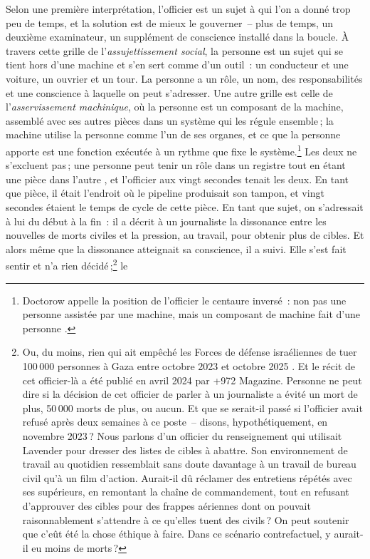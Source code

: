 Selon une première interprétation, l'officier est un sujet à qui l'on a donné trop peu de temps, et la solution est de mieux le gouverner~– plus de temps, un deuxième examinateur, un supplément de conscience installé dans la boucle. À travers cette grille de l'\emph{assujettissement social}, la personne est un sujet qui se tient hors d'une machine et s'en sert comme d'un outil~: un conducteur et une voiture, un ouvrier et un tour. La personne a un rôle, un nom, des responsabilités et une conscience à laquelle on peut s'adresser. Une autre grille est celle de l'\emph{asservissement machinique}, où la personne est un composant de la machine, assemblé avec ses autres pièces dans un système qui les régule ensemble\,; la machine utilise la personne comme l'un de ses organes, et ce que la personne apporte est une fonction exécutée à un rythme que fixe le système.\footnote{Doctorow appelle la position de l'officier le centaure inversé~: non pas une personne assistée par une machine, mais un composant de machine fait d'une personne \autocite{doctorow2026reversecentaur}.} Les deux ne s'excluent pas\,; une personne peut tenir un rôle dans un registre tout en étant une pièce dans l'autre \autocite[Plateau 13, «\,The Apparatus of Capture\,»~: il y a asservissement quand des êtres humains sont eux-mêmes les pièces constituantes d'une machine qu'ils composent entre eux et avec d'autres choses, sous le contrôle et la direction d'une unité supérieure, et assujettissement quand l'unité supérieure constitue l'être humain en sujet rapporté à un nouvel objet extérieur, qui peut être un animal, un outil, ou même une machine]{deleuze1987plateaus}, et l'officier aux vingt secondes tenait les deux. En tant que pièce, il était l'endroit où le pipeline produisait son tampon, et vingt secondes étaient le temps de cycle de cette pièce. En tant que sujet, on s'adressait à lui du début à la fin~: il a décrit à un journaliste la dissonance entre les nouvelles de morts civiles et la pression, au travail, pour obtenir plus de cibles. Et alors même que la dissonance atteignait sa conscience, il a suivi. Elle s'est fait sentir et n'a rien décidé\,;\footnote{Ou, du moins, rien qui ait empêché les Forces de défense israéliennes de tuer 100\,000 personnes à Gaza entre octobre 2023 et octobre 2025 \autocite{gomezugarte2025uncertainty,acosta2026gaza,economist2025gaza}. Et le récit de cet officier-là a été publié en avril 2024 par +972 Magazine. Personne ne peut dire si la décision de cet officier de parler à un journaliste a évité un mort de plus, 50\,000 morts de plus, ou aucun. Et que se serait-il passé si l'officier avait refusé après deux semaines à ce poste~– disons, hypothétiquement, en novembre 2023\,? Nous parlons d'un officier du renseignement qui utilisait Lavender pour dresser des listes de cibles à abattre. Son environnement de travail au quotidien ressemblait sans doute davantage à un travail de bureau civil qu'à un film d'action. Aurait-il dû réclamer des entretiens répétés avec ses supérieurs, en remontant la chaîne de commandement, tout en refusant d'approuver des cibles pour des frappes aériennes dont on pouvait raisonnablement s'attendre à ce qu'elles tuent des civils\,? On peut soutenir que c'eût été la chose éthique à faire. Dans ce scénario contrefactuel, y aurait-il eu moins de morts\,?} le 